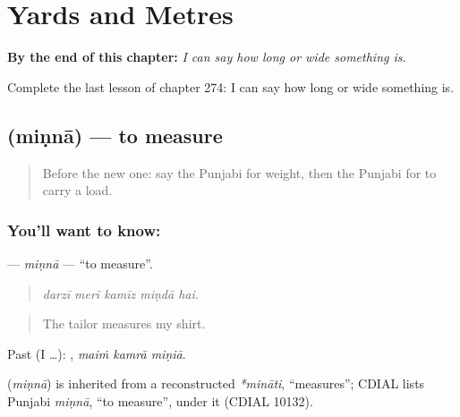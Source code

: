 
\chapter{Yards and Metres}
\label{ch:pa-a2-yards-and-metres}

\begin{chapteropening}
\textbf{By the end of this chapter:} \emph{I can say how long or wide something is.}

Complete the last lesson of chapter 274: I can say how long or wide something is.
\end{chapteropening}

\section[\texorpdfstring{\pa{ਮਿਣਨਾ} (miṇnā)}{ਮਿਣਨਾ (miṇnā)}]{ (miṇnā) — to measure}

\label{lesson:PA-C274-minna}



\begin{quote}
Before the new one: say the Punjabi for weight, then the Punjabi for to carry a load.
\end{quote}

\subsection*{You'll want to know: }
\textbf{} — \emph{miṇnā} — \textquotedblleft{}to measure\textquotedblright{}.

\begin{quote}
    
\end{quote}

\begin{quote}
\emph{darzī merī kamīz miṇdā hai.}
\end{quote}

\begin{quote}
The tailor measures my shirt.
\end{quote}

Past (I …):   , \emph{maiṁ kamrā miṇiā}.

\begin{cousinweb}
\textbf{} (\emph{miṇnā}) is inherited from a reconstructed \emph{*mināti}, \textquotedblleft{}measures\textquotedblright{}; CDIAL lists Punjabi \emph{miṇnā}, \textquotedblleft{}to measure\textquotedblright{}, under it (CDIAL 10132).
\end{cousinweb}

